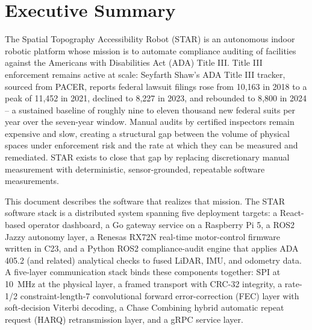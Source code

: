 \documentclass[11pt,letterpaper]{article}
\begin{document}
\setcounter{page}{1}
\tableofcontents
\clearpage
\listoffigures
\listoftables
\clearpage

\setcounter{page}{1}

\section{Executive Summary}
\label{sec:executive-summary}

The Spatial Topography Accessibility Robot (STAR) is an autonomous indoor
robotic platform whose mission is to automate compliance auditing of
facilities against the Americans with Disabilities Act (ADA) Title III.
Title III enforcement remains active at scale: Seyfarth Shaw's
ADA Title III tracker, sourced from PACER, reports federal lawsuit
filings rose from 10{,}163 in 2018 to a peak of 11{,}452 in 2021,
declined to 8{,}227 in 2023, and rebounded to 8{,}800 in 2024 -- a
sustained baseline of roughly nine to eleven thousand new federal
suits per year over the seven-year window. Manual audits by certified
inspectors remain expensive and slow, creating a structural gap
between the volume of physical spaces under enforcement risk and the
rate at which they can be measured and remediated. STAR exists to
close that gap by replacing discretionary manual measurement with
deterministic, sensor-grounded, repeatable software measurements.

This document describes the software that realizes that mission. The
STAR software stack is a distributed system spanning five deployment
targets: a React-based operator dashboard, a Go gateway service on a
Raspberry Pi 5, a ROS2 Jazzy autonomy layer, a Renesas RX72N real-time
motor-control firmware written in C23, and a Python ROS2
compliance-audit engine that applies ADA 405.2 (and related) analytical
checks to fused LiDAR, IMU, and odometry data. A five-layer
communication stack binds these components together: SPI at
\qty{10}{\mega\hertz} at the physical layer, a framed transport with
CRC-32 integrity, a rate-1/2 constraint-length-7 convolutional forward
error-correction (FEC) layer with soft-decision Viterbi decoding, a
Chase Combining hybrid automatic repeat request (HARQ) retransmission
layer, and a gRPC service layer.
\end{document}
